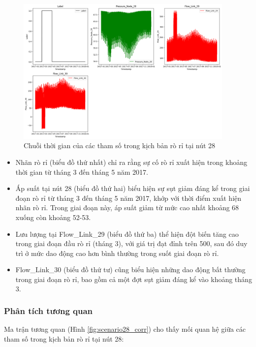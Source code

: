 \begin{figure}[H]
    \centering
    \includegraphics[width=0.95\textwidth]{image/section5_1/scenario28_timeseries.png}
    \caption{Chuỗi thời gian của các tham số trong kịch bản rò rỉ tại nút 28}
    \label{fig:scenario28_timeseries}
\end{figure}

\begin{itemize}
    \item Nhãn rò rỉ (biểu đồ thứ nhất) chỉ ra rằng sự cố rò rỉ xuất hiện trong khoảng thời gian từ tháng 3 đến tháng 5 năm 2017.
    \item Áp suất tại nút 28 (biểu đồ thứ hai) biểu hiện sự sụt giảm đáng kể trong giai đoạn rò rỉ từ tháng 3 đến tháng 5 năm 2017, khớp với thời điểm xuất hiện nhãn rò rỉ. Trong giai đoạn này, áp suất giảm từ mức cao nhất khoảng 68 xuống còn khoảng 52-53.
    \item Lưu lượng tại Flow\_Link\_29 (biểu đồ thứ ba) thể hiện đột biến tăng cao trong giai đoạn đầu rò rỉ (tháng 3), với giá trị đạt đỉnh trên 500, sau đó duy trì ở mức dao động cao hơn bình thường trong suốt giai đoạn rò rỉ.
    \item Flow\_Link\_30 (biểu đồ thứ tư) cũng biểu hiện những dao động bất thường trong giai đoạn rò rỉ, bao gồm cả một đợt sụt giảm đáng kể vào khoảng tháng 3.
\end{itemize}

\subsubsection{Phân tích tương quan}

Ma trận tương quan (Hình \ref{fig:scenario28_corr}) cho thấy mối quan hệ giữa các tham số trong kịch bản rò rỉ tại nút 28:

